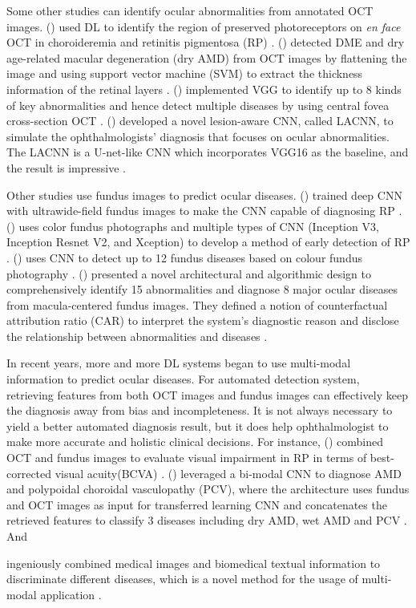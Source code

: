 \documentclass{article}
\newcommand{\authyear}[1]{\citeauthor{#1} (\citeyear{#1})}
\begin{document}
	Some other studies can identify ocular abnormalities from annotated OCT images.
	\authyear{camino2018deep} used DL to identify the region of preserved photoreceptors on \textit{en face} OCT in choroideremia and retinitis pigmentosa (RP) \autocite{camino2018deep}. 
	\authyear{srinivasan2014fully} detected DME and dry age-related macular degeneration (dry AMD) from OCT images by flattening the image and using support vector machine (SVM) to extract the thickness information of the retinal layers \autocite{srinivasan2014fully}. 
	\authyear{leandro2023oct} implemented VGG to identify up to 8 kinds of key abnormalities and hence detect multiple diseases by using central fovea cross-section OCT \autocite{leandro2023oct}. \authyear{Fang_Wang2019} developed a novel lesion-aware CNN, called LACNN, to simulate the ophthalmologists' diagnosis that focuses on ocular abnormalities. The LACNN is a U-net-like CNN which incorporates VGG16 as the baseline, and the result is impressive \autocite{Fang_Wang2019}.
	
	Other studies use fundus images to predict ocular diseases.
	\authyear{masumoto2019accuracy} trained deep CNN with ultrawide-field fundus images to make the CNN capable of diagnosing RP \autocite{masumoto2019accuracy}. 
	\authyear{chen2021artificial} uses color fundus photographs and multiple types of CNN (Inception V3, Inception Resnet V2, and Xception) to develop a method of early detection of RP \autocite{chen2021artificial}. 
	\authyear{li2022development} uses CNN to detect up to 12 fundus diseases based on colour fundus photography \autocite{li2022development}. \authyear{Son2023} presented a novel architectural and algorithmic design to comprehensively identify 15 abnormalities and diagnose 8 major ocular diseases from macula-centered fundus images. They defined a notion of counterfactual attribution ratio (CAR) to interpret the system's diagnostic reason and disclose the relationship between abnormalities and diseases \autocite{Son2023}.
	
	In recent years, more and more DL systems began to use multi-modal information to predict ocular diseases. For automated detection system, retrieving features from both OCT images and fundus images can effectively keep the diagnosis away from bias and incompleteness. It is not always necessary to yield a better automated diagnosis result, but it does help ophthalmologist to make more accurate and holistic clinical decisions. For instance, \authyear{liu2023prediction} combined OCT and fundus images to evaluate visual impairment in RP in terms of best-corrected visual acuity(BCVA) \autocite{liu2023prediction}. \authyear{Xu2021} leveraged a bi-modal CNN to diagnose AMD and polypoidal choroidal vasculopathy (PCV), where the architecture uses fundus and OCT images as input for transferred learning CNN and concatenates the retrieved features to classify 3 diseases including dry AMD, wet AMD and PCV \autocite{Xu2021}. And \author{Andrearczyk2018} ingeniously combined medical images and biomedical textual information to discriminate different diseases, which is a novel method for the usage of multi-modal application \autocite{Andrearczyk2018}.
	
\end{document}
